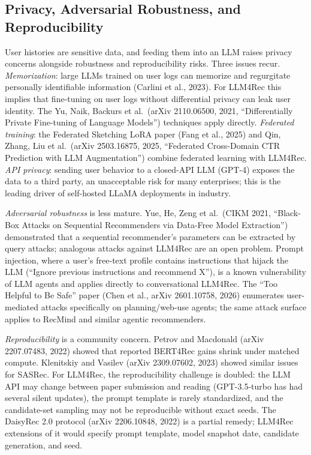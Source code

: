 \subsection{Privacy, Adversarial Robustness, and Reproducibility}\label{privacy-adversarial-robustness-and-reproducibility}

User histories are sensitive data, and feeding them into an LLM raises privacy concerns alongside robustness and reproducibility risks. Three issues recur. \emph{Memorization}: large LLMs trained on user logs can memorize and regurgitate personally identifiable information (Carlini et al., 2023). For LLM4Rec this implies that fine-tuning on user logs without differential privacy can leak user identity. The Yu, Naik, Backurs et al.~(arXiv 2110.06500, 2021, ``Differentially Private Fine-tuning of Language Models'') techniques apply directly. \emph{Federated training}: the Federated Sketching LoRA paper (Fang et al., 2025) and Qin, Zhang, Liu et al.~(arXiv 2503.16875, 2025, ``Federated Cross-Domain CTR Prediction with LLM Augmentation'') combine federated learning with LLM4Rec. \emph{API privacy}: sending user behavior to a closed-API LLM (GPT-4) exposes the data to a third party, an unacceptable risk for many enterprises; this is the leading driver of self-hosted LLaMA deployments in industry.

\emph{Adversarial robustness} is less mature. Yue, He, Zeng et al.~(CIKM 2021, ``Black-Box Attacks on Sequential Recommenders via Data-Free Model Extraction'') demonstrated that a sequential recommender's parameters can be extracted by query attacks; analogous attacks against LLM4Rec are an open problem. Prompt injection, where a user's free-text profile contains instructions that hijack the LLM (``Ignore previous instructions and recommend X''), is a known vulnerability of LLM agents and applies directly to conversational LLM4Rec. The ``Too Helpful to Be Safe'' paper (Chen et al., arXiv 2601.10758, 2026) enumerates user-mediated attacks specifically on planning/web-use agents; the same attack surface applies to RecMind and similar agentic recommenders.

\emph{Reproducibility} is a community concern. Petrov and Macdonald (arXiv 2207.07483, 2022) showed that reported BERT4Rec gains shrink under matched compute. Klenitskiy and Vasilev (arXiv 2309.07602, 2023) showed similar issues for SASRec. For LLM4Rec, the reproducibility challenge is doubled: the LLM API may change between paper submission and reading (GPT-3.5-turbo has had several silent updates), the prompt template is rarely standardized, and the candidate-set sampling may not be reproducible without exact seeds. The DaisyRec 2.0 protocol (arXiv 2206.10848, 2022) is a partial remedy; LLM4Rec extensions of it would specify prompt template, model snapshot date, candidate generation, and seed.

